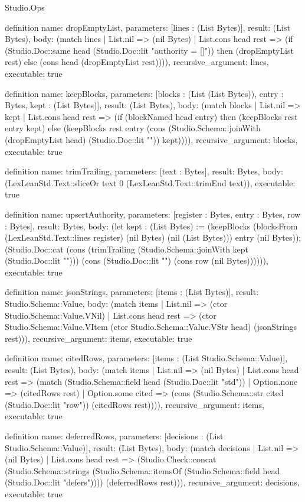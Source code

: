 \begin{lexlean}{Studio.Ops}
\begin{semanticmodule}
definition{
  name: dropEmptyList,
  parameters: [lines : (List Bytes)],
  result: (List Bytes),
  body: (match lines
    | List.nil => (nil Bytes)
    | List.cons head rest => (if (Studio.Doc::same head (Studio.Doc::lit "authority = []")) then (dropEmptyList rest) else (cons head (dropEmptyList rest)))),
  recursive_argument: lines,
  executable: true
}


definition{
  name: keepBlocks,
  parameters: [blocks : (List (List Bytes)), entry : Bytes, kept : (List Bytes)],
  result: (List Bytes),
  body: (match blocks
    | List.nil => kept
    | List.cons head rest => (if (blockNamed head entry) then (keepBlocks rest entry kept) else (keepBlocks rest entry (cons (Studio.Schema::joinWith (dropEmptyList head) (Studio.Doc::lit "\n")) kept)))),
  recursive_argument: blocks,
  executable: true
}


definition{
  name: trimTrailing,
  parameters: [text : Bytes],
  result: Bytes,
  body: (LexLeanStd.Text::sliceOr text 0 (LexLeanStd.Text::trimEnd text)),
  executable: true
}


definition{
  name: upsertAuthority,
  parameters: [register : Bytes, entry : Bytes, row : Bytes],
  result: Bytes,
  body: (let kept : (List Bytes) := (keepBlocks (blocksFrom (LexLeanStd.Text::lines register) (nil Bytes) (nil (List Bytes))) entry (nil Bytes)); (Studio.Doc::cat (cons (trimTrailing (Studio.Schema::joinWith kept (Studio.Doc::lit "\n"))) (cons (Studio.Doc::lit "\n\n") (cons row (nil Bytes)))))),
  executable: true
}


definition{
  name: jsonStrings,
  parameters: [items : (List Bytes)],
  result: Studio.Schema::Value,
  body: (match items
    | List.nil => (ctor Studio.Schema::Value.VNil)
    | List.cons head rest => (ctor Studio.Schema::Value.VItem (ctor Studio.Schema::Value.VStr head) (jsonStrings rest))),
  recursive_argument: items,
  executable: true
}


definition{
  name: citedRows,
  parameters: [items : (List Studio.Schema::Value)],
  result: (List Bytes),
  body: (match items
    | List.nil => (nil Bytes)
    | List.cons head rest => (match (Studio.Schema::field head (Studio.Doc::lit "std"))
      | Option.none => (citedRows rest)
      | Option.some cited => (cons (Studio.Schema::str cited (Studio.Doc::lit "row")) (citedRows rest)))),
  recursive_argument: items,
  executable: true
}

definition{
  name: deferredRows,
  parameters: [decisions : (List Studio.Schema::Value)],
  result: (List Bytes),
  body: (match decisions
    | List.nil => (nil Bytes)
    | List.cons head rest => (Studio.Check::concat (Studio.Schema::strings (Studio.Schema::itemsOf (Studio.Schema::field head (Studio.Doc::lit "defers")))) (deferredRows rest))),
  recursive_argument: decisions,
  executable: true
}


\end{semanticmodule}
\end{lexlean}
